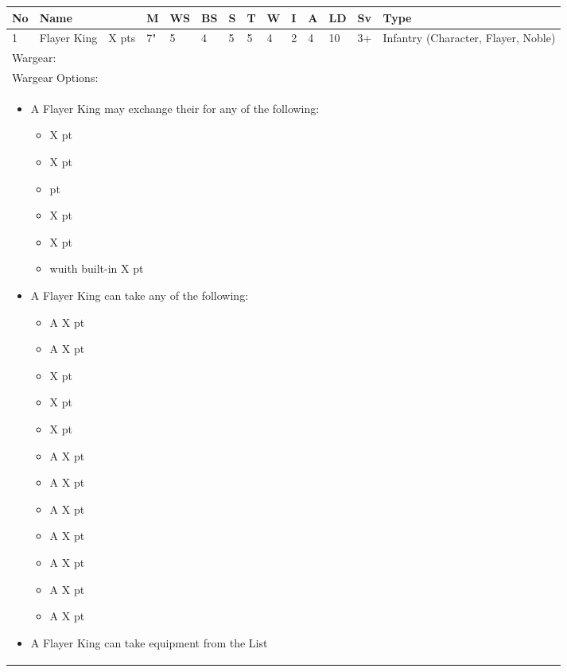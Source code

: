 \noindent
\begin{tabular}{||m{10pt} m{95pt} m{30pt} m{11pt} m{11pt} m{11pt} m{11pt} m{11pt} m{11pt} m{11pt} m{11pt} m{11pt} m{11pt} m{125pt}||}
	\hline
	No & Name & & M & WS & BS & S & T & W & I & A & LD & Sv & Type \\
	\hline
	1 & Flayer King & X pts & 7" & 5 & 4 & 5 & 5 & 4 & 2 & 4 & 10 & 3+ & Infantry (Character, Flayer, Noble)\\
	\hline
	\hline
	\multicolumn{14}{||Z{532 pt}||}{Wargear: \quickref{Staff of Light}}\\
	\multicolumn{14}{||Z{532 pt}||}{Wargear Options:} \\	
	\multicolumn{14}{||Z{532 pt}||}{\begin{itemize}
			\item A Flayer King may exchange their \quickref{Staff of Light} for any of the following:
			\begin{itemize}
				\item \quickref{Hyperphase Sword} \hrulefill X pt
				\item \quickref{Rod of Night} \hrulefill X pt
				\item \quickref{Voidblade} \hrulefill 0 pt
				\item \quickref{Voidscythe} \hrulefill X pt
				\item \quickref{Warscythe} \hrulefill X pt
				\item \quickref{Warscythe} wuith built-in \quickref{Relic Gauss Blaster} \hrulefill X pt
			\end{itemize}
			\item A Flayer King can take any of the following:
			\begin{itemize}
				\item A \quickref{Gauntlet of Fire} \hrulefill X pt
				\item A \quickref{Tachyon Arrow} \hrulefill X pt
				\item \quickref{Bloodswarm Scarabs} \hrulefill X pt
				\item \quickref{Flensing Scarabs} \hrulefill X pt
				\item \quickref{Mindshackle Scarabs} \hrulefill X pt
				\item A \quickref{Phase Shifter} \hrulefill X pt
				\item A \quickref{Phylactery} \hrulefill X pt
				\item A \quickref{Resurrection Orb} \hrulefill X pt
				\item A \quickref{Sempiternal Weave} \hrulefill X pt
				\item A \quickref{Shadow Ankh} \hrulefill X pt
				\item A \quickref{Tesseract Labyrinth} \hrulefill X pt
				\item A \quickref{Translocation Shroud} \hrulefill X pt
			\end{itemize}
			\item A Flayer King can take equipment from the \quickref{Artefacts of the Aeons} List
	\end{itemize}} \\	
	
\end{tabular}

